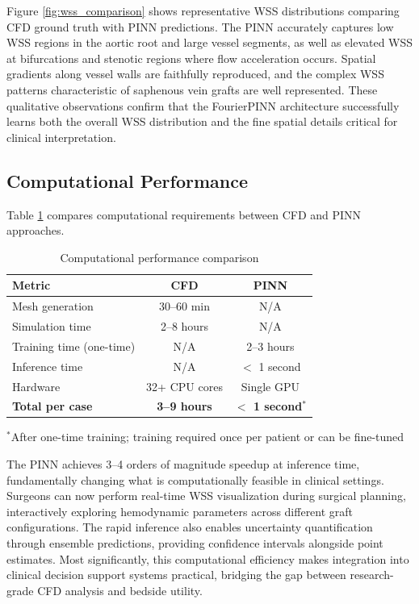 \documentclass[12pt,a4paper]{article}
\begin{document}
Figure \ref{fig:wss_comparison} shows representative WSS distributions comparing CFD ground truth with PINN predictions. The PINN accurately captures low WSS regions in the aortic root and large vessel segments, as well as elevated WSS at bifurcations and stenotic regions where flow acceleration occurs. Spatial gradients along vessel walls are faithfully reproduced, and the complex WSS patterns characteristic of saphenous vein grafts are well represented. These qualitative observations confirm that the FourierPINN architecture successfully learns both the overall WSS distribution and the fine spatial details critical for clinical interpretation.

\subsection{Computational Performance}

Table \ref{tab:timing} compares computational requirements between CFD and PINN approaches.

\begin{table}[htbp]
\centering
\caption{Computational performance comparison}
\label{tab:timing}
\begin{tabular}{lcc}
\toprule
\textbf{Metric} & \textbf{CFD} & \textbf{PINN} \\
\midrule
Mesh generation & 30--60 min & N/A \\
Simulation time & 2--8 hours & N/A \\
Training time (one-time) & N/A & 2--3 hours \\
Inference time & N/A & $<$ 1 second \\
Hardware & 32+ CPU cores & Single GPU \\
\midrule
\textbf{Total per case} & \textbf{3--9 hours} & \textbf{$<$ 1 second}$^*$ \\
\bottomrule
\end{tabular}
\begin{tablenotes}
\small
\item $^*$After one-time training; training required once per patient or can be fine-tuned
\end{tablenotes}
\end{table}

The PINN achieves 3--4 orders of magnitude speedup at inference time, fundamentally changing what is computationally feasible in clinical settings. Surgeons can now perform real-time WSS visualization during surgical planning, interactively exploring hemodynamic parameters across different graft configurations. The rapid inference also enables uncertainty quantification through ensemble predictions, providing confidence intervals alongside point estimates. Most significantly, this computational efficiency makes integration into clinical decision support systems practical, bridging the gap between research-grade CFD analysis and bedside utility.
\end{document}
